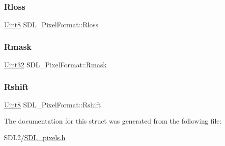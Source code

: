 \subsubsection{\texorpdfstring{Rloss}{Rloss}}
{\footnotesize\ttfamily \hyperlink{_s_d_l__stdinc_8h_a2944638813a090aa23e62f4da842c3e2}{Uint8} S\+D\+L\+\_\+\+Pixel\+Format\+::\+Rloss}

\mbox{\label{struct_s_d_l___pixel_format_a35e5793f6e9c356aec2d130167174946}} 
\subsubsection{\texorpdfstring{Rmask}{Rmask}}
{\footnotesize\ttfamily \hyperlink{_s_d_l__stdinc_8h_add440eff171ea5f55cb00c4a9ab8672d}{Uint32} S\+D\+L\+\_\+\+Pixel\+Format\+::\+Rmask}

\mbox{\label{struct_s_d_l___pixel_format_abfdec7b9ee2ee39db630f4022e4e0daa}} 
\subsubsection{\texorpdfstring{Rshift}{Rshift}}
{\footnotesize\ttfamily \hyperlink{_s_d_l__stdinc_8h_a2944638813a090aa23e62f4da842c3e2}{Uint8} S\+D\+L\+\_\+\+Pixel\+Format\+::\+Rshift}



The documentation for this struct was generated from the following file\+:\begin{DoxyCompactItemize}
\item 
S\+D\+L2/\hyperlink{_s_d_l__pixels_8h}{S\+D\+L\+\_\+pixels.\+h}\end{DoxyCompactItemize}
